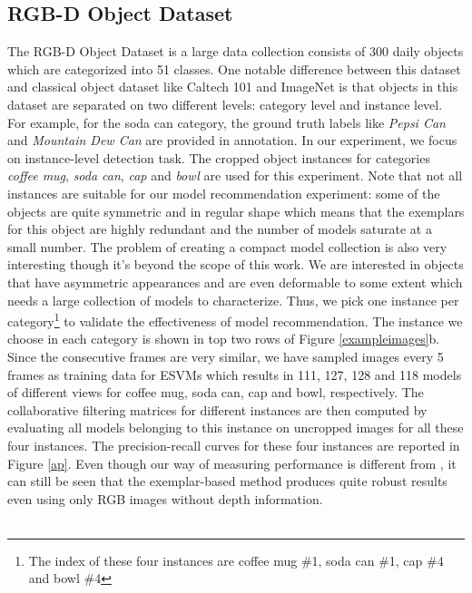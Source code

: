 \documentclass{article} %
\begin{document}
\subsection{RGB-D Object Dataset}
The RGB-D Object Dataset is a large data collection consists of 300 daily objects which are categorized into 51 classes. One notable difference between this dataset and classical object dataset like Caltech 101 and ImageNet is that objects in this dataset are separated on two different levels: category level and instance level. For example, for the soda can category, the ground truth labels like \emph{Pepsi Can} and \emph{Mountain Dew Can} are provided in annotation. In our experiment, we focus on instance-level detection task. The cropped object instances for categories \emph{coffee mug}, \emph{soda can}, \emph{cap} and \emph{bowl} are used for this experiment. Note that not all instances are suitable for our model recommendation experiment: some of the objects are quite symmetric and in regular shape which means that the exemplars for this object are highly redundant and the number of models saturate at a small number. The problem of creating a compact model collection is also very interesting though it's beyond the scope of this work. We are interested in objects that have asymmetric appearances and are even deformable to some extent which needs a large collection of models to characterize. Thus, we pick one instance per category\footnote{The index of these four instances are coffee mug \#1, soda can \#1, cap \#4 and bowl \#4} to validate the effectiveness of model recommendation. The instance we choose in each category is shown in top two rows of Figure \ref{exampleimages}b. Since the consecutive frames are very similar, we have sampled images every 5 frames as training data for ESVMs which results in 111, 127, 128 and 118 models of different views for coffee mug, soda can, cap and bowl, respectively. The collaborative filtering matrices for different instances are then computed by evaluating all models belonging to this instance on uncropped images for all these four instances. The precision-recall curves for these four instances are reported in Figure \ref{ap}. Even though our way of measuring performance is different from \cite{lai2011large}, it can still be seen that the exemplar-based method produces quite robust results even using only RGB images without depth information. \\\\
\end{document}
